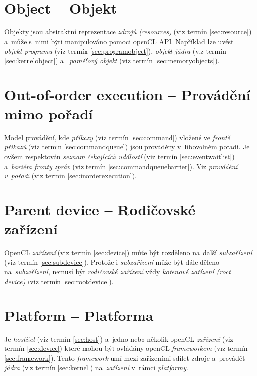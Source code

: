 \section{Object -- Objekt}
\label{sec:object}

Objekty jsou abstraktní reprezentace \emph{zdrojů (resources)} (viz termín \ref{sec:resource}) a~může s~nimi býti manipulováno pomoci openCL API. Například lze uvést
\emph{objekt programu} (viz termín \ref{sec:programobject}), \emph{objekt jádra} (viz termín \ref{sec:kernelobject}) a~
\emph{paměťový objekt} (viz termín \ref{sec:memoryobjects}).

\section{Out-of-order execution -- Provádění mimo pořadí}
\label{sec:outoforderexecution}

Model provádění, kde \emph{příkazy} (viz termín \ref{sec:command}) vložené ve \emph{frontě příkazů} (viz termín \ref{sec:commandqueue}) jsou prováděny v~libovolném pořadí. Je ovšem respektován \emph{seznam čekajících událostí} (viz termín \ref{sec:eventwaitlist}) a~\emph{bariéra fronty zpráv} (viz termín \ref{sec:commandqueuebarrier}). Viz \emph{provádění v~pořadí} (viz termín \ref{sec:inorderexecution}).

\section{Parent device -- Rodičovské zařízení}
\label{sec:parentdevice}

OpenCL \emph{zařízení} (viz termín \ref{sec:device}) může být rozděleno na~další \emph{subzařízení} (viz termín \ref{sec:subdevice}).
Protože i \emph{subzařízení} může být dále děleno na~\emph{subzařízení}, nemusí být \emph{rodičovské zařízení} vždy \emph{kořenové zařízení (root device)} (viz termín \ref{sec:rootdevice}).

\section{Platform -- Platforma}
\label{sec:platform}

Je \emph{hostitel} (viz termín \ref{sec:host}) a~jedno nebo několik openCL \emph{zařízení} (viz termín \ref{sec:device}) které mohou být ovládány openCL \emph{frameworkem} (viz termín \ref{sec:framework}). Tento \emph{framework} umí mezi zařízeními sdílet zdroje a~provádět \emph{jádra} (viz termín \ref{sec:kernel}) na~\emph{zařízení} v~rámci \emph{platformy}.	

